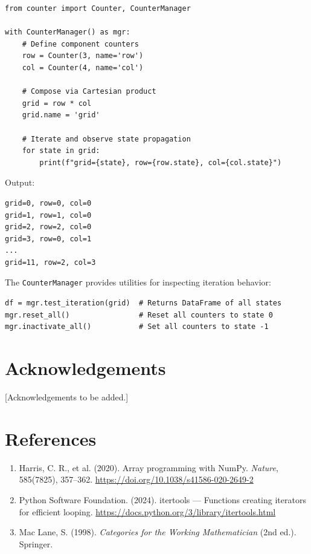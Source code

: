 \documentclass[10pt,a4paper,onecolumn]{article}
\begin{document}
\begin{lstlisting}
from counter import Counter, CounterManager

with CounterManager() as mgr:
    # Define component counters
    row = Counter(3, name='row')
    col = Counter(4, name='col')
    
    # Compose via Cartesian product
    grid = row * col
    grid.name = 'grid'
    
    # Iterate and observe state propagation
    for state in grid:
        print(f"grid={state}, row={row.state}, col={col.state}")
\end{lstlisting}

Output:
\begin{lstlisting}[language={}]
grid=0, row=0, col=0
grid=1, row=1, col=0
grid=2, row=2, col=0
grid=3, row=0, col=1
...
grid=11, row=2, col=3
\end{lstlisting}

The \texttt{CounterManager} provides utilities for inspecting iteration behavior:

\begin{lstlisting}
df = mgr.test_iteration(grid)  # Returns DataFrame of all states
mgr.reset_all()                # Reset all counters to state 0
mgr.inactivate_all()           # Set all counters to state -1
\end{lstlisting}

\section{Acknowledgements}

[Acknowledgements to be added.]

\section{References}

\begin{enumerate}
\item Harris, C. R., et al. (2020). Array programming with NumPy. \textit{Nature}, 585(7825), 357--362. \url{https://doi.org/10.1038/s41586-020-2649-2}

\item Python Software Foundation. (2024). itertools --- Functions creating iterators for efficient looping. \url{https://docs.python.org/3/library/itertools.html}

\item Mac Lane, S. (1998). \textit{Categories for the Working Mathematician} (2nd ed.). Springer.
\end{enumerate}
\end{document}
